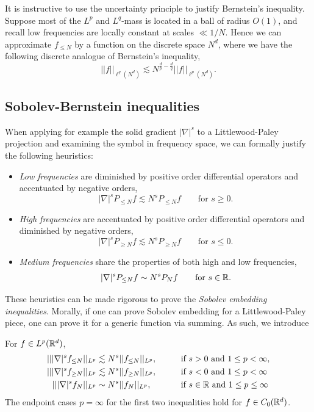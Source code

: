\begin{remark}
	It is instructive to use the uncertainty principle to justify Bernstein's inequality. Suppose most of the $L^p$ and $L^q$-mass is located in a ball of radius $O(1)$, and recall low frequencies are locally constant at scales $\ll 1/N$. Hence we can approximate $f_{\leq N}$ by a function on the discrete space $N^d$, where we have the following discrete analogue of Bernstein's inequality,
		\[ ||f||_{\ell^q (N^d)} \lesssim N^{\frac{d}{p} - \frac{d}{q}} ||f||_{\ell^p (N^d)}. \]
\end{remark}


\subsection{Sobolev-Bernstein inequalities}

When applying for example the solid gradient $|\nabla|^s$ to a Littlewood-Paley projection and examining the symbol in frequency space, we can formally justify the following heuristics:
\begin{itemize}
	\item \textit{Low frequencies} are diminished by positive order differential operators and accentuated by negative orders, 
		\[ |\nabla|^s P_{\leq N} f \lesssim N^s P_{\leq N } f \qquad \text{for $s \geq 0$}.\] 
	
	\item \textit{High frequencies} are accentuated by positive order differential operators and diminished by negative orders,
		\[ |\nabla|^{s} P_{\geq N} f \lesssim N^{s}P_{\geq N} f \qquad \text{for $s \leq 0$}.\] 
	
	\item \textit{Medium frequencies} share the properties of both high and low frequencies,  	
		\[ |\nabla|^s P_{\leq N} f \sim N^s P_N f \qquad \text{for $s \in \mathbb R$}.\] 
\end{itemize}
These heuristics can be made rigorous to prove the \textit{Sobolev embedding inequalities}. Morally, if one can prove Sobolev embedding for a Littlewood-Paley piece, one can prove it for a generic function via summing. As such, we introduce


\begin{lemma} For $f \in L^p (\mathbb R^d)$, 
				\begin{alignat*}{2}
					|| |\nabla|^s f_{\leq N}||_{L^p} 
						&\lesssim N^s ||f_{\leq N}||_{L^p}, &&\qquad\text{if }s > 0 \text{ and } 1 \leq p < \infty, \\
					|| |\nabla|^s f_{\geq N}||_{L^p} 
						&\lesssim N^s ||f_{\geq N}||_{L^p}, &&\qquad\text{if }s < 0 \text{ and } 1 \leq p < \infty \\
					|| |\nabla|^s f_N||_{L^p} 
						&\sim N^s ||f_N||_{L^p}, &&\qquad \text{if }s \in \mathbb R \text{ and } 1 \leq p \leq \infty
				\end{alignat*}			
		The endpoint cases $p = \infty$ for the first two inequalities hold for $f \in C_0 (\mathbb R^d)$. 
\end{lemma}

